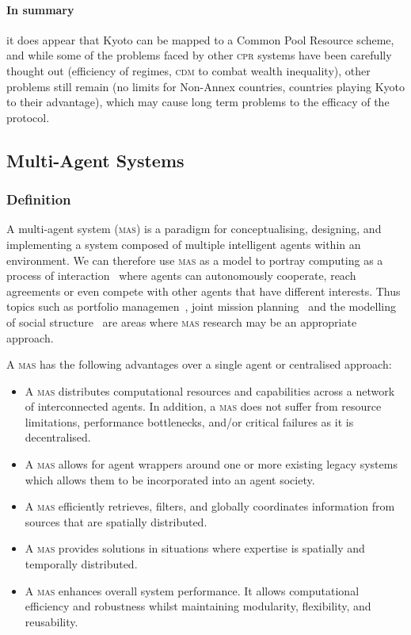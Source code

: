 \paragraph{In summary} it does appear that Kyoto can be mapped to a Common Pool Resource scheme, and while some of the problems faced by other \textsc{cpr} systems have been carefully thought out (efficiency of regimes, \textsc{cdm} to combat wealth inequality), other problems still remain (no limits for Non-Annex countries, countries playing Kyoto to their advantage), which may cause long term problems to the efficacy of the protocol.

\subsection{Multi-Agent Systems}

\subsubsection{Definition}

A multi-agent system (\textsc{mas}) is a paradigm for conceptualising, designing, and implementing a system composed of multiple intelligent agents within an environment. We can therefore use \textsc{mas} as a model to portray computing as a process of interaction~\cite{MAS-DoC} where agents can autonomously cooperate, reach agreements or even compete with other agents that have different interests.  Thus topics such as portfolio managemen~\cite{Warren-ISA}, joint mission planning~\cite{Joccasta-ISA} and the modelling of social structure~\cite{jasss-soc-surrey} are areas where \textsc{mas} research may be an appropriate approach.

A \textsc{mas} has the following advantages over a single agent or centralised approach:

\begin{itemize}
	\item A \textsc{mas} distributes computational resources and capabilities across a network of interconnected agents. In addition, a \textsc{mas} does not suffer from resource limitations, performance bottlenecks, and/or critical failures as it is decentralised.

	\item A \textsc{mas} allows for agent wrappers around one or more existing legacy systems which allows them to be incorporated into an agent society.

	\item A \textsc{mas} efficiently retrieves, filters, and globally coordinates information from sources that are spatially distributed.

	\item A \textsc{mas} provides solutions in situations where expertise is spatially and temporally distributed.

	\item A \textsc{mas} enhances overall system performance. It allows computational efficiency and robustness whilst maintaining modularity, flexibility, and reusability.
\end{itemize}


